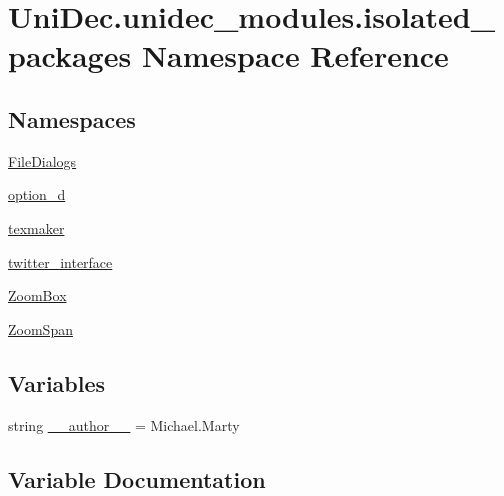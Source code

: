 \hypertarget{namespace_uni_dec_1_1unidec__modules_1_1isolated__packages}{}\section{Uni\+Dec.\+unidec\+\_\+modules.\+isolated\+\_\+packages Namespace Reference}
\label{namespace_uni_dec_1_1unidec__modules_1_1isolated__packages}
\subsection*{Namespaces}
\begin{DoxyCompactItemize}
\item 
 \hyperlink{namespace_uni_dec_1_1unidec__modules_1_1isolated__packages_1_1_file_dialogs}{File\+Dialogs}
\item 
 \hyperlink{namespace_uni_dec_1_1unidec__modules_1_1isolated__packages_1_1option__d}{option\+\_\+d}
\item 
 \hyperlink{namespace_uni_dec_1_1unidec__modules_1_1isolated__packages_1_1texmaker}{texmaker}
\item 
 \hyperlink{namespace_uni_dec_1_1unidec__modules_1_1isolated__packages_1_1twitter__interface}{twitter\+\_\+interface}
\item 
 \hyperlink{namespace_uni_dec_1_1unidec__modules_1_1isolated__packages_1_1_zoom_box}{Zoom\+Box}
\item 
 \hyperlink{namespace_uni_dec_1_1unidec__modules_1_1isolated__packages_1_1_zoom_span}{Zoom\+Span}
\end{DoxyCompactItemize}
\subsection*{Variables}
\begin{DoxyCompactItemize}
\item 
string \hyperlink{namespace_uni_dec_1_1unidec__modules_1_1isolated__packages_a2eed3de65e98ebbabd5fec721d15911c}{\+\_\+\+\_\+author\+\_\+\+\_\+} = \textquotesingle{}Michael.\+Marty\textquotesingle{}
\end{DoxyCompactItemize}


\subsection{Variable Documentation}
\hypertarget{namespace_uni_dec_1_1unidec__modules_1_1isolated__packages_a2eed3de65e98ebbabd5fec721d15911c}{}
